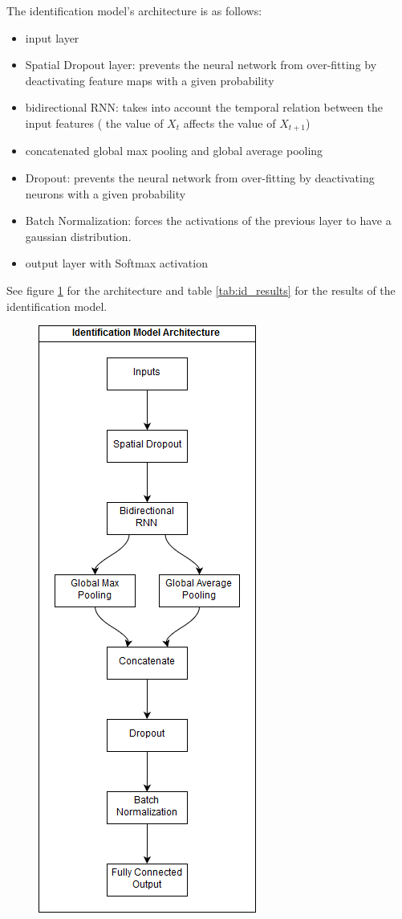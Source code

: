 \documentclass{article}
\begin{document}
The identification model's architecture is as follows:
\begin{itemize}
    \item input layer 
    \item Spatial Dropout layer: prevents the neural network from over-fitting by deactivating feature maps with a given probability
    \item bidirectional RNN: takes into account the temporal relation between the input features ( the value of $X_t$ affects the value of $X_{t+1}$)
    \item concatenated global max pooling and global average pooling
    \item Dropout:  prevents the neural network from over-fitting by deactivating neurons with a given probability
    \item Batch Normalization: forces the activations of the previous layer to have a gaussian distribution.
    \item output layer with Softmax activation
\end{itemize}
See figure \ref{fig:id_arch} for the architecture and table \ref{tab:id_results} for the results of the identification model.
\begin{figure}[H]
    \centering
    \includegraphics[scale=.65]{images/id_model.png}
    \label{fig:id_arch}
\end{figure}
\end{document}
